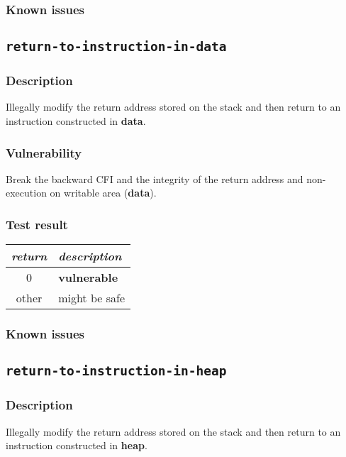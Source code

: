 \documentclass[a4paper]{book}
\begin{document}
\subsubsection{Known issues}

\newpage
\subsection{\texttt{return-to-instruction-in-data}}\label{test-return-to-instruction-in-data}

\subsubsection{Description}
Illegally modify the return address stored on the stack and then return to  an instruction constructed in \textbf{data}.

\subsubsection{Vulnerability}
Break the backward CFI and the integrity of the return address and non-execution on writable area (\textbf{data}).

\subsubsection{Test result}
\begin{tabular}{cl}
  \toprule
  \emph{return}  & \emph{description} \\
  \midrule
  0              & \textbf{vulnerable} \\
  other          & might be safe \\
  \bottomrule
\end{tabular}
  
\subsubsection{Known issues}

\newpage
\subsection{\texttt{return-to-instruction-in-heap}}\label{test-return-to-instruction-in-heap}

\subsubsection{Description}
Illegally modify the return address stored on the stack and then return to  an instruction constructed in \textbf{heap}.
\end{document}
